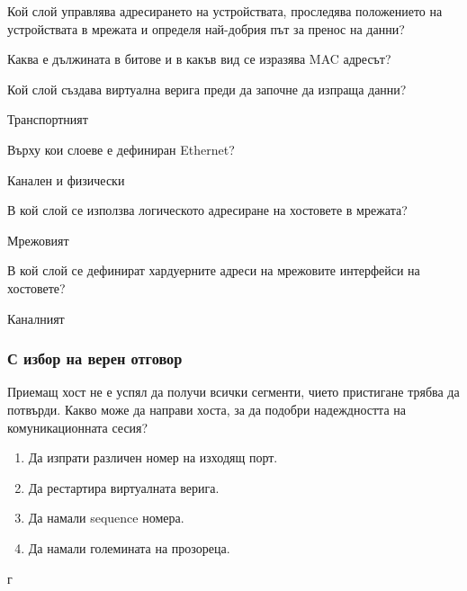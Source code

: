 \begin{q}
  Кой слой управлява адресирането на устройствата, проследява положението на
  устройствата в мрежата и определя най-добрия път за пренос на данни?
\end{q}

\begin{q}
  Каква е дължината в битове и в какъв вид се изразява MAC адресът?
\end{q}

\begin{q}
  Кой слой създава виртуална верига преди да започне да изпраща данни?

  \rans Транспортният
\end{q}

\begin{q}
  Върху кои слоеве е дефиниран Ethernet?

  \rans Канален и физически
\end{q}

\begin{q}
  В кой слой се използва логическото адресиране на хостовете в мрежата?

  \rans Мрежовият
\end{q}

\begin{q}
  В кой слой се дефинират хардуерните адреси на мрежовите интерфейси на
  хостовете?

  \rans Каналният
\end{q}

\subsubsection{С избор на верен отговор}
\begin{q}
  Приемащ хост не е успял да получи всички сегменти, чието пристигане трябва да
  потвърди. Какво може да направи хоста, за да подобри надеждността на
  комуникационната сесия?

  \begin{enumerate}
  \item Да изпрати различен номер на изходящ порт.
  \item Да рестартира виртуалната верига.
  \item Да намали sequence номера.
  \item Да намали големината на прозореца.
  \end{enumerate}

  \rans г
\end{q}

